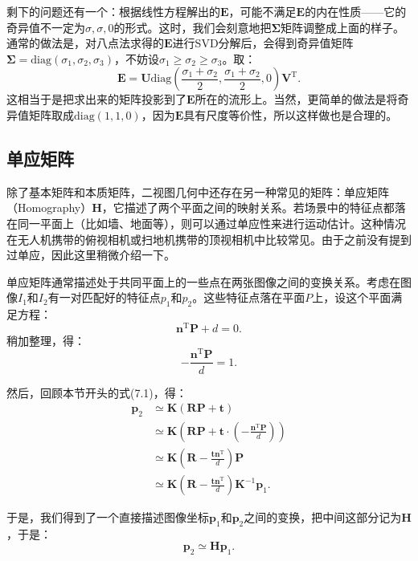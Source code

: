剩下的问题还有一个：根据线性方程解出的$\bm{E}$，可能不满足$\bm{E}$的内在性质——它的奇异值不一定为${\sigma}, {\sigma}, 0$的形式。这时，我们会刻意地把$\bm{\Sigma}$矩阵调整成上面的样子。通常的做法是，对八点法求得的$\bm{E}$进行SVD分解后，会得到奇异值矩阵$\bm{\Sigma} =  \mathrm{diag} ( \sigma_1, \sigma_2, \sigma_3)$，不妨设$\sigma_1 \geqslant \sigma_2 \geqslant \sigma_3$。取：
\begin{equation}
\bm{E} = \bm{U} \mathrm{diag} (\frac{\sigma_1+\sigma_2}{2}, \frac{\sigma_1+\sigma_2}{2}, 0) \bm{V}^\mathrm{T}.
\end{equation}
这相当于是把求出来的矩阵投影到了$\bm{E}$所在的流形上。当然，更简单的做法是将奇异值矩阵取成$\mathrm{diag} (1,1,0)$，因为$\bm{E}$具有尺度等价性，所以这样做也是合理的。

\subsection{单应矩阵}
除了基本矩阵和本质矩阵，二视图几何中还存在另一种常见的矩阵：单应矩阵（Homography）$\bm{H}$，它描述了两个平面之间的映射关系。若场景中的特征点都落在同一平面上（比如墙、地面等），则可以通过单应性来进行运动估计。这种情况在无人机携带的俯视相机或扫地机携带的顶视相机中比较常见。由于之前没有提到过单应，因此这里稍微介绍一下。

单应矩阵通常描述处于共同平面上的一些点在两张图像之间的变换关系。考虑在图像$I_{1}$和$I_{2}$有一对匹配好的特征点$p_{1}$和$p_{2}$。这些特征点落在平面$P$上，设这个平面满足方程：
\begin{equation}
\bm{n}^\mathrm{T} \bm{P} + d = 0.
\end{equation}
稍加整理，得：
\begin{equation}
- \frac{\bm{n}^\mathrm{T} \bm{P} }{d} = 1.
\end{equation}

然后，回顾本节开头的式(7.1)，得：
\begin{align*}
\bm{p}_2 &\simeq \bm{K} ( \bm{R} \bm{P} + \bm{t} ) \\ 
&\simeq \bm{K} \left( \bm{R} \bm{P} + \bm{t} \cdot (- \frac{\bm{n}^\mathrm{T} \bm{P} }{d}) \right) \\
&\simeq \bm{K} \left( \bm{R} - \frac{\bm{t} \bm{n}^\mathrm{T} }{d} \right) \bm{P} \\ 
&\simeq \bm{K} \left( \bm{R} - \frac{\bm{t} \bm{n}^\mathrm{T} }{d} \right) \bm{K}^{-1} \bm{p}_1.
\end{align*}

于是，我们得到了一个直接描述图像坐标$\bm{p}_1$和$\bm{p}_2$之间的变换，把中间这部分记为$\bm{H}$，于是：
\begin{equation}
\bm{p}_2 \simeq \bm{H} \bm{p}_1.
\end{equation}

